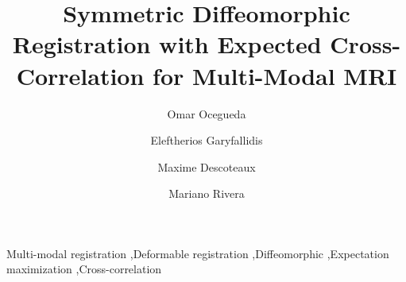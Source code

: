 \documentclass[authoryear,preprint,review,9pt]{elsarticle}
\begin{document}
\begin{frontmatter}

\title{\textbf{Symmetric Diffeomorphic Registration with Expected Cross-Correlation for Multi-Modal MRI}}
\author[cimat]{Omar Ocegueda}
\author[scil]{Eleftherios Garyfallidis}
\author[scil]{Maxime Descoteaux}
\author[cimat]{Mariano Rivera}
\address[cimat]{Centro de Investigaci\'{o}n en Matem\'{a}ticas, Guanajuato, Gto, M\'{e}xico}
\address[scil]{Computer Science Department, Universit\'{e} de Sherbrooke, Sherbrooke, Qu\'{e}bec, Canada}



\begin{keyword}
Multi-modal registration \sep Deformable registration \sep Diffeomorphic \sep Expectation maximization \sep Cross-correlation
\end{keyword}

\end{frontmatter}









\clearpage


\end{document}

